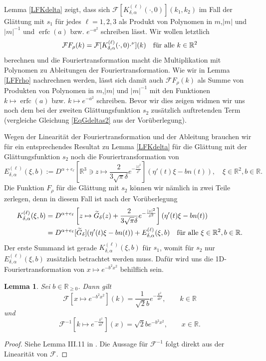 \documentclass[12pt,a4paper]{scrartcl}
\newtheorem{Lemma}[Satz]{Lemma}
\numberwithin{equation}{section}
\newcommand{\R}{\mathbb{R}} %
\newcommand{\F}{\mathcal{F}} %
\newcommand{\erfc}{\operatorname{erfc}}
\newcommand{\fa}{\text{\quad für alle }}
\begin{document}
Lemma \ref{LFKdelta} zeigt, dass sich $\F [K_{\delta,\alpha}^{(\ell)}(\cdot,0)](k_1,k_2)$ im Fall der Glättung mit $s_1$ für jedes $\ell=1,2,3$ als Produkt von Polynomen in $m$,$|m|$ und $|m|^{-1}$ und $\erfc(a)$ bzw. $e^{-a^2}$ schreiben lässt. Wir wollen letztlich 
\[
\F F_\rho(k) = \F [K_{\delta,\alpha}^{(\ell)}(\cdot,0)\cdot^\nu ](k) \fa k \in \R^2
\]
berechnen und die Fouriertransformation macht die Multiplikation mit Polynomen zu Ableitungen der Fouriertransformation. Wie wir in Lemma \ref{LFFrho} nachrechnen werden, lässt sich damit auch $\F F_\rho(k)$ als Summe von Produkten von Polynomen in $m$,$|m|$ und $|m|^{-1}$  mit den Funktionen  $k \mapsto \erfc(a)$ bzw. $k \mapsto e^{-a^2}$ schreiben. Bevor wir dies zeigen widmen wir uns noch dem bei der zweiten Glättungsfunktion $s_2$ zusätzlich auftretenden Term (vergleiche Gleichung \eqref{EqGdeltas2} aus der Vorüberlegung).

Wegen der Linearität der Fouriertransformation und der Ableitung brauchen wir für ein entsprechendes Resultat zu Lemma \ref{LFKdelta} für die Glättung mit der Glättungsfunktion $s_2$ noch die Fouriertransformation von  
\[
E_{\delta,\alpha}^{(\ell)}(\xi,b):=D^{\alpha+e_\ell}\left[\R^3 \ni z \mapsto \frac{2}{3 \sqrt{\pi} \delta } e^{-\frac{|z|^2}{\delta^2}}\right](\eta'(t) \xi - b n(t)),  \quad \xi \in \R^2, b \in \R.
\]
Die Funktion $F_\rho$ für die Glättung mit $s_2$ können wir nämlich in zwei Teile zerlegen, denn in diesem Fall ist nach der Vorüberlegung
\begin{align*}
K_{\delta,\alpha}^{(\ell)}(\xi,b) &= D^{\alpha+e_\ell}\left[z \mapsto \widetilde G_\delta(z) + \frac{2}{3 \sqrt{\pi} \delta } e^{-\frac{|z|^2}{\delta^2}}\right](\eta'(t) \xi - b n(t)) \\
&=D^{\alpha+e_\ell}[\widetilde G_\delta](\eta'(t) \xi - b n(t)) + E_{\delta,\alpha}^{(\ell)}(\xi,b) \fa \xi \in \R^2, b\in \R.
\end{align*}
Der erste Summand ist gerade $K_{\delta,\alpha}^{(\ell)}(\xi,b)$ für $s_1$, womit für $s_2$ nur $E_{\delta,\alpha}^{(\ell)}(\xi,b)$ zusätzlich betrachtet werden muss.
Dafür wird uns die 1D-Fouriertransformation von $x \mapsto e^{-b^2 x^2}$ behilflich sein.
\begin{Lemma} \label{LFexp}
Sei $b \in \R_{\geq 0}$. Dann gilt
\[
\F \left[x \mapsto e^{-b^2 x^2} \right](k)= \frac{1}{\sqrt{2} b} e^{-\frac{k^2}{4 b^2}}, \qquad k \in \R
\]
und 
\[
\F^{-1}\left[k \mapsto e^{-\frac{k^2}{4 b^2}}\right](x) = \sqrt{2} b e^{-b^2 x^2}, \qquad x \in \R.
\]
\end{Lemma}
\begin{proof}
Siehe Lemma III.11 in  \cite{Collet}. Die Aussage für $\F^{-1}$ folgt direkt aus der Linearität von $\F$.
\end{proof}
\end{document}
